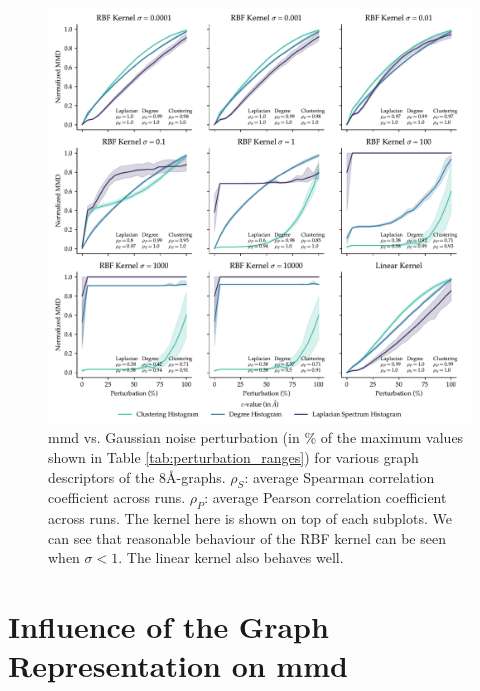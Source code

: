 \begin{figure}[!htbp]
  \centering
  \includegraphics[width=\textwidth]{./figures/results/res_1_2.pdf}
  \caption[Influence of kernel parameters on \gls{mmd} behaviour.]{\gls{mmd} vs. Gaussian
    noise perturbation (in \% of the maximum values shown
    in Table \ref{tab:perturbation_ranges}) for various graph descriptors of the
    8\si{\angstrom}-graphs. $\rho_{S}$: average Spearman correlation coefficient
    across runs. $\rho_{P}$: average Pearson correlation coefficient across runs.
    The kernel here is shown on top of each subplots. We can see that reasonable
    behaviour of the RBF kernel can be seen when $\sigma<1$. The linear kernel also
    behaves well.}
  \label{fig:mmd_effect_kernel}
\end{figure}

\section{Influence of the Graph Representation on \gls{mmd}}\label{sec:results_sensitivity}

